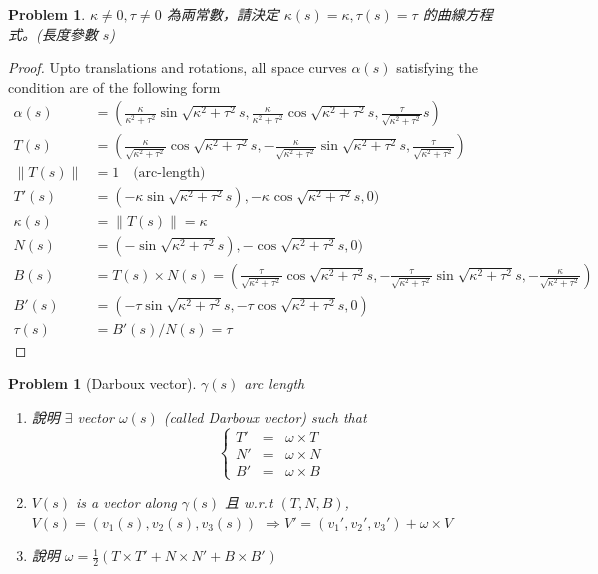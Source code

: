 \documentclass[10pt,a4paper]{article}
\newcounter{theProblemCounter}
\newtheorem{problem}[theProblemCounter]{Problem}
\begin{document}
\setcounter{theProblemCounter}{3}
\begin{problem}
$\kappa\ne 0, \tau \ne 0$ 為兩常數，請決定 $\kappa(s)=\kappa, \tau(s)=\tau$ 的曲線方程式。(長度參數 $s$)
\end{problem}
\begin{proof}
Upto translations and rotations, all space curves $\alpha(s)$ satisfying the condition are of the following form
\begin{align*}
\alpha(s) &= (\frac{\kappa}{\kappa^2 + \tau^2}\sin\sqrt{\kappa^2 + \tau^2}s, \frac{\kappa}{\kappa^2 + \tau^2}\cos\sqrt{\kappa^2 + \tau^2}s, \frac{\tau}{\sqrt{\kappa^2 + \tau^2}}s) \\
T(s) &= (\frac{\kappa}{\sqrt{\kappa^2 + \tau^2}}\cos\sqrt{\kappa^2 + \tau^2}s, -\frac{\kappa}{\sqrt{\kappa^2 + \tau^2}}\sin\sqrt{\kappa^2 + \tau^2}s, \frac{\tau}{\sqrt{\kappa^2 + \tau^2}}) \\
\|T(s)\| &= 1 \quad\text{(arc-length)}\\
T'(s) &= (-\kappa\sin\sqrt{\kappa^2 + \tau^2}s), -\kappa\cos\sqrt{\kappa^2 + \tau^2}s, 0) \\
\kappa(s) &= \|T(s)\| = \kappa \\
N(s) &= (-\sin\sqrt{\kappa^2 + \tau^2}s), -\cos\sqrt{\kappa^2 + \tau^2}s, 0) \\
B(s) &= T(s)\times N(s) = (\frac{\tau}{\sqrt{\kappa^2 + \tau^2}}\cos\sqrt{\kappa^2 + \tau^2}s, -\frac{\tau}{\sqrt{\kappa^2 + \tau^2}}\sin\sqrt{\kappa^2 + \tau^2}s, -\frac{\kappa}{\sqrt{\kappa^2 + \tau^2}}) \\
B'(s) &= (-\tau\sin\sqrt{\kappa^2 + \tau^2}s, -\tau\cos\sqrt{\kappa^2 + \tau^2}s, 0) \\
\tau(s) &= B'(s)/N(s) = \tau
\end{align*}
\end{proof}

\setcounter{theProblemCounter}{4}
\begin{problem}[Darboux vector]
$\gamma(s)$ arc length
\begin{enumerate}
\item[(a)] 說明 $\exists$ vector $\omega(s)$ (called \emph{Darboux vector}) such that 
\[
\left\{
\begin{array}{ccc}
T' &=& \omega\times T\\
N' &=& \omega\times N\\
B' &=& \omega\times B\end{array}
\right.
\]
\item[(b)] $V(s)$ is a vector along $\gamma(s)$ 且 w.r.t $(T, N,B)$, $V(s)=(v_1(s), v_2(s), v_3(s))$ $\Rightarrow V' = (v_1', v_2', v_3') + \omega \times V$
\item[(c)] 說明 $\omega=\frac12 (T\times T' + N\times N' + B\times B')$
\end{enumerate}
\end{problem}
\end{document}
